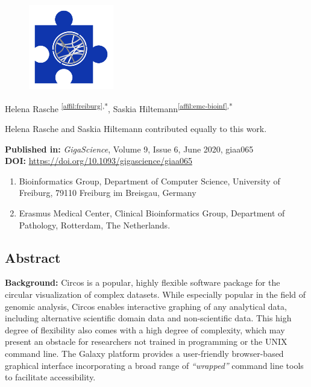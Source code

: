 \cleartorightpage
\setcounter{NAT@ctr}{-1}
\chapter*{}\label{chapter:circos}

\begin{figure}[t!]
\centering
\includegraphics[height=10em]{frontmatter/images/chapter-header-circos.png}
\end{figure}
\vspace{-4cm}



Helena Rasche \textsuperscript{\ref{affil:freiburg},*},
Saskia Hiltemann\textsuperscript{\ref{affil:emc-bioinf},*}

{\color{chaptergrey}{*}} Helena Rasche and Saskia Hiltemann contributed equally to this work.

\textbf{Published in:} \emph{GigaScience}, Volume 9, Issue 6, June 2020, giaa065 \\
\textbf{DOI:} \url{https://doi.org/10.1093/gigascience/giaa065}

\small
\begin{enumerate}
 \itemsep-0.5em
 \item Bioinformatics Group, Department of Computer Science, University of Freiburg, 79110 Freiburg im Breisgau, Germany\label{affil:freiburg}
 \item Erasmus Medical Center, Clinical Bioinformatics Group, Department of Pathology, Rotterdam, The Netherlands.\label{affil:emc-bioinf}
\end{enumerate}



\section*{Abstract}

\textbf{Background:}
Circos is a popular, highly flexible software package for the circular visualization of complex datasets. While especially popular in the field of genomic analysis, Circos enables interactive graphing of any analytical data, including alternative scientific domain data and non-scientific data. This high degree of flexibility also comes with a high degree of complexity, which may present an obstacle for researchers not trained in programming or the UNIX command line. The Galaxy platform provides a user-friendly browser-based graphical interface incorporating a broad range of \emph{“wrapped”} command line tools to facilitate accessibility.


